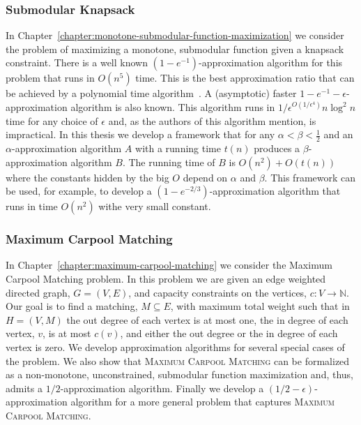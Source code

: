 \subsubsection*{Submodular Knapsack} 
In Chapter~\ref{chapter:monotone-submodular-function-maximization} we consider the problem of maximizing a monotone, submodular function given a knapsack constraint.
There is a well known $(1-e^{-1})$-approximation algorithm for this problem that runs in $O(n^5)$ time.
This is the best approximation ratio that can be achieved by a polynomial time algorithm~\cite{khuller1999budgeted}.
A (asymptotic) faster $1 - e^{-1} - \epsilon$-approximation algorithm is also known.
This algorithm runs in $1/\epsilon^{O(1/\epsilon^4)}n\log^2n$ time for any choice of $\epsilon$ and, as the authors of this algorithm mention, is impractical.
In this thesis we develop a framework that for any $\alpha < \beta < \frac{1}{2}$ and an $\alpha$-approximation algorithm $A$ with a running time $t(n)$ produces a $\beta$-approximation algorithm $B$.
The running time of $B$ is $O(n^2) + O(t(n))$ where the constants hidden by the big $O$ depend on $\alpha$ and $\beta$.
This framework can be used, for example, to develop a $(1-e^{-2/3})$-approximation algorithm that runs in time $O(n^2)$ withe very small constant.

\subsubsection*{Maximum Carpool Matching}
In Chapter~\ref{chapter:maximum-carpool-matching} we consider the Maximum Carpool Matching problem.
In this problem we are given an edge weighted directed graph, $G=(V, E)$, and capacity constraints on the vertices, $c:V \to \mathbb{N}$.
Our goal is to find a matching, $M \subseteq E$, with maximum total weight such that in $H = (V, M)$ the out degree of each vertex is at most one, the in degree of each vertex, $v$, is at most $c(v)$, and either the out degree or the in degree of each vertex is zero.
We develop approximation algorithms for several special cases of the problem. 
We also show that \textsc{Maximum Carpool Matching} can be formalized as a non-monotone, unconstrained, submodular function maximization and, thus, admits a $1/2$-approximation algorithm.
Finally we develop a $(1/2 - \epsilon)$-approximation algorithm for a more general problem that captures \textsc{Maximum Carpool Matching}.